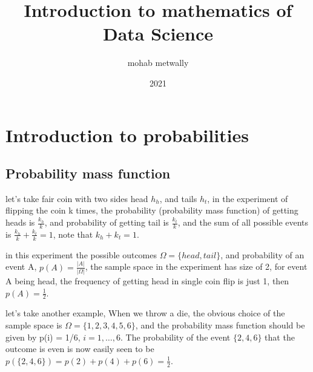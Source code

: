 \documentclass[4apaper,12pt]{book}
\begin{document}
\title{Introduction to mathematics of Data Science}

\author{mohab metwally}
\date{2021}
\maketitle
\tableofcontents

\chapter{Introduction to probabilities}
\section {Probability mass function}
\begin{description}
\item let's take fair coin with two sides head $h_h$, and tails $h_t$, in the experiment of flipping the coin k times, the probability (probability mass function) of getting heads is $\frac{k_{h}}{k}$, and probability of getting tail is $\frac{k_{t}}{k}$, and the sum of all possible events is $\frac{k_{h}}{k} + \frac{k_{t}}{k}=1$, note that $k_{h}+k_{t}=1$.
\item in this experiment the possible outcomes $\Omega = \{head, tail\}$, and probability of an event A, $p(A) = \frac{\left|A\right|}{\left|\Omega\right|}$, the sample space in the experiment has size of 2, for event A being head, the frequency of getting head in single coin flip is just 1, then $p(A) = \frac{1}{2}$.
\item let's take another example, When we throw a die, the obvious choice of the
  sample space is $\Omega = \{1, 2, 3, 4, 5, 6\}$, and the probability mass function should be
  given by p(i) = 1/6, $i = 1, \dots , 6$. The probability of the event $\{2, 4, 6\}$ that the
  outcome is even is now easily seen to be $p(\{2,4,6\}) = p(2) + p(4) + p(6) = \frac{1}{2}$.
\end{description}
\end{document}
